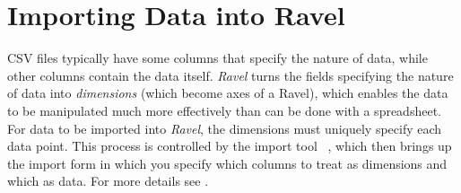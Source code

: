 \section{Importing Data into Ravel}

CSV files typically have some columns that specify the nature
of data, while other columns contain the data itself. \emph{Ravel}
turns the fields specifying the nature of data into \emph{dimensions}
(which become axes of a Ravel), which enables the data to be manipulated
much more effectively than can be done with a spreadsheet. For data
to be imported into \emph{Ravel}, the dimensions must uniquely specify
each data point. This process is controlled by the import tool
~, which then brings up the import
form in which you specify which columns to treat as dimensions and
which as data. For more details see .
